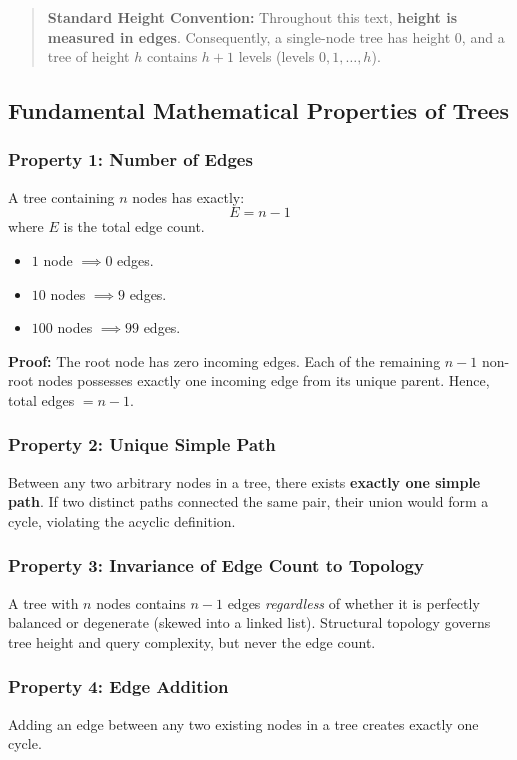 \begin{quote}
\textbf{Standard Height Convention:} Throughout this text, \textbf{height is measured in edges}. Consequently, a single-node tree has height $0$, and a tree of height $h$ contains $h + 1$ levels (levels $0, 1, \dots, h$).
\end{quote}

\subsection{Fundamental Mathematical Properties of Trees}

\subsubsection{Property 1: Number of Edges}
A tree containing $n$ nodes has exactly:
\[
\boxed{E = n - 1}
\]
where $E$ is the total edge count.
\begin{itemize}
    \item $1$ node $\implies 0$ edges.
    \item $10$ nodes $\implies 9$ edges.
    \item $100$ nodes $\implies 99$ edges.
\end{itemize}
\textbf{Proof:} The root node has zero incoming edges. Each of the remaining $n - 1$ non-root nodes possesses exactly one incoming edge from its unique parent. Hence, total edges $= n - 1$.

\subsubsection{Property 2: Unique Simple Path}
Between any two arbitrary nodes in a tree, there exists \textbf{exactly one simple path}. If two distinct paths connected the same pair, their union would form a cycle, violating the acyclic definition.

\subsubsection{Property 3: Invariance of Edge Count to Topology}
A tree with $n$ nodes contains $n - 1$ edges \emph{regardless} of whether it is perfectly balanced or degenerate (skewed into a linked list). Structural topology governs tree height and query complexity, but never the edge count.

\subsubsection{Property 4: Edge Addition}
Adding an edge between any two existing nodes in a tree creates exactly one cycle.

